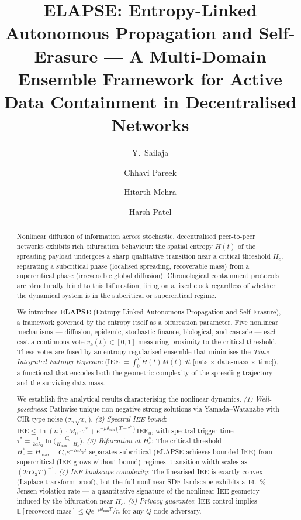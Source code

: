 \documentclass[review,12pt]{elsarticle}
\newcommand{\IEE}{\mathrm{IEE}}
\newcommand{\Hc}{H_c}
\newcommand{\Hmax}{H_{\max}}
\begin{document}
\begin{frontmatter}

\title{ELAPSE: Entropy-Linked Autonomous Propagation and Self-Erasure ---
       A Multi-Domain Ensemble Framework for Active Data Containment
       in Decentralised Networks}

\author[rv]{Y.~Sailaja}

\author[rv]{Chhavi Pareek}
\author[rv]{Hitarth Mehra}
\author[rv]{Harsh Patel}

\address[rv]{Department of Mathematics / Department of Computer Science \&
             Engineering, RV College of Engineering, Bangalore 560059, India}

\begin{abstract}
Nonlinear diffusion of information across stochastic, decentralised peer-to-peer
networks exhibits rich bifurcation behaviour: the spatial entropy $H(t)$ of the
spreading payload undergoes a sharp qualitative transition near a critical
threshold $\Hc$, separating a subcritical phase (localised spreading, recoverable
mass) from a supercritical phase (irreversible global diffusion). Chronological
containment protocols~\cite{geambasu2009vanish,tang2010fade} are structurally blind
to this bifurcation, firing on a fixed clock regardless of whether the dynamical
system is in the subcritical or supercritical regime.

We introduce \textbf{ELAPSE} (Entropy-Linked Autonomous Propagation and
Self-Erasure), a framework governed by the entropy itself as a bifurcation
parameter. Five nonlinear mechanisms --- diffusion, epidemic, stochastic-finance,
biological, and cascade --- each cast a continuous vote $v_k(t) \in [0,1]$
measuring proximity to the critical threshold. These votes are fused by an
entropy-regularised ensemble that minimises the \emph{Time-Integrated Entropy
Exposure} (IEE $= \int_0^T H(t)M(t)\,dt$ [nats $\times$ data-mass $\times$ time]),
a functional that encodes both the geometric complexity of the spreading trajectory
and the surviving data mass.

We establish five analytical results characterising the nonlinear dynamics.
\emph{(1) Well-posedness}: Pathwise-unique non-negative strong solutions via
Yamada--Watanabe with CIR-type noise ($\sigma_n\sqrt{x_i}$).
\emph{(2) Spectral IEE bound}: $\IEE \leq \ln(n) \cdot M_0 \cdot
\tau^* + e^{-\mu\delta_{\min}(T-\tau^*)}\IEE_0$, with spectral trigger time
$\tau^* = \frac{1}{2\alpha\lambda_2}\ln\!\bigl(\tfrac{C_0}{\Hmax-\Hc}\bigr)$.
\emph{(3) Bifurcation at $\Hc^*$}: The critical threshold
$\Hc^* = \Hmax - C_0 e^{-2\alpha\lambda_2 T}$
separates subcritical (ELAPSE achieves bounded IEE) from supercritical
(IEE grows without bound) regimes; transition width scales as
$(2\alpha\lambda_2 T)^{-1}$.
\emph{(4) IEE landscape complexity}: The linearised IEE is exactly convex
(Laplace-transform proof), but the full nonlinear SDE landscape exhibits
a 14.1\% Jensen-violation rate --- a quantitative signature of the
nonlinear IEE geometry induced by the bifurcation near $\Hc$.
\emph{(5) Privacy guarantee}: IEE control implies
$\mathbb{E}[\text{recovered mass}] \leq Q e^{-\mu\delta_{\min}T}/n$
for any $Q$-node adversary.


\end{abstract}
\end{frontmatter}
\end{document}
